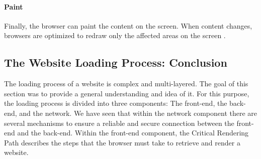 

\paragraph{Paint} %

Finally, the browser can paint the content on the screen.
When content changes, browsers are optimized to redraw only the affected areas on the screen \cite{2021MDNCRP}.












\subsection{The Website Loading Process: Conclusion} %

The loading process of a website is complex and multi-layered.
The goal of this section was to provide a general understanding and idea of it.
For this purpose, the loading process is divided into three components: The front-end, the back-end, and the network.
We have seen that within the network component there are several mechanisms to ensure a reliable and secure connection between the front-end and the back-end.
Within the front-end component, the Critical Rendering Path describes the steps that the browser must take to retrieve and render a website.

